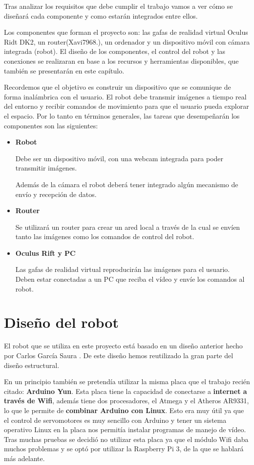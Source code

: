 \documentclass[twoside, 11pt]{epstfg}
\begin{document}
Tras analizar los requisitos que debe cumplir el trabajo vamos a ver cómo se diseñará cada componente y como estarán integrados entre ellos.

Los componentes que forman el proyecto son: las gafas de realidad virtual Oculus Ridt DK2, un router(Xavi7968.), un ordenador y un dispositivo móvil con cámara integrada (robot).
El diseño de los componentes, el control del robot y las conexiones se realizaran en base a los recursos y herramientas disponibles, que también se presentarán en este capítulo.

Recordemos que el objetivo es construir un dispositivo que se comunique de forma inalámbrica con el usuario. El robot debe transmir imágenes a tiempo real del entorno y recibir comandos de movimiento para que el usuario pueda explorar el espacio.
Por lo tanto en términos generales, las tareas que desempeñarán los componentes son las siguientes:
\begin{itemize}
	\item \textbf{Robot} 
	
		Debe ser un dispositivo móvil, con una webcam integrada para poder transmitir imágenes.
		
		Además de la cámara el robot deberá tener integrado algún mecanismo de envío y recepción de datos.
	\item \textbf{Router}
	
		Se utilizará un router para crear un ared local a través de la cual se envíen tanto las imágenes como los comandos de control del robot.
	\item \textbf{Oculus Rift y PC}
		
		Las gafas de realidad virtual reproducirán las imágenes para el usuario. Deben estar conectadas a un PC que reciba el vídeo y envíe los comandos al robot.
		
\end{itemize}


\section{Diseño del robot}

El robot que se utiliza en este proyecto está basado en un diseño anterior hecho por Carlos García Saura \cite{garcia2012low}. De este diseño hemos reutilizado la gran parte del diseño estructural.

En un principio también se pretendía utilizar la misma placa que el trabajo recién citado: \textbf{Arduino Yun}.
Esta placa tiene la capacidad de conectarse a \textbf{internet a través de Wifi}, además tiene dos procesadores, el Atmega y el Atheros AR9331, lo que le permite de \textbf{combinar Arduino con Linux}. Esto era muy útil ya que el control de servomotores es muy sencillo con Arduino y tener un sistema operativo Linux en la placa nos permitía instalar programas de manejo de vídeo.
Tras muchas pruebas se decidió no utilizar esta placa ya que el módulo Wifi daba muchos problemas y se optó por utilizar la Raspberry Pi 3, de la que se hablará más adelante.
\end{document}
